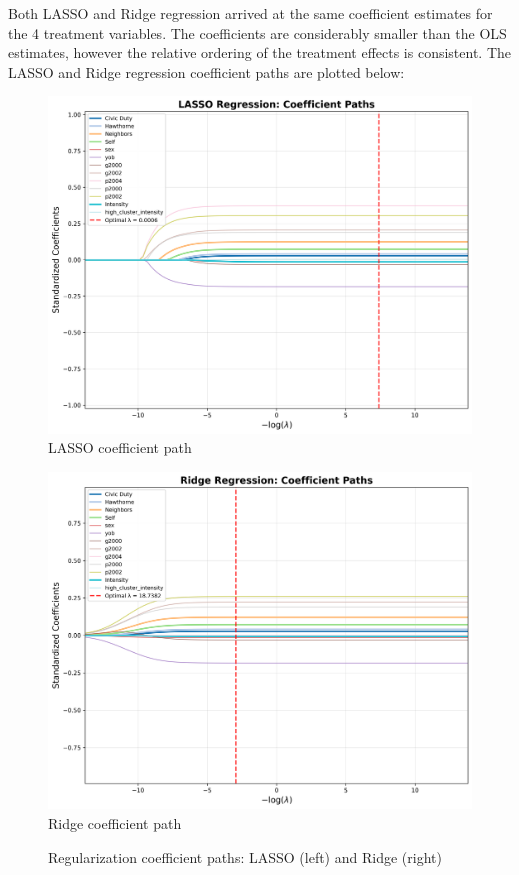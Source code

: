 \documentclass[11pt]{article}
\begin{document}
Both LASSO and Ridge regression arrived at the same coefficient estimates for the 4 treatment variables. The coefficients are considerably smaller than the OLS estimates, however the relative ordering of the treatment effects is consistent. The LASSO and Ridge regression coefficient paths are plotted below:
\begin{figure}[H]
    \centering
    \begin{minipage}[t]{0.48\textwidth}
        \centering
        \includegraphics[width=\linewidth]{../Output/Plots/lasso_coefficients.png}
        \vspace{0.3em}
        {\small LASSO coefficient path}
    \end{minipage}
    \hfill
    \begin{minipage}[t]{0.48\textwidth}
        \centering
        \includegraphics[width=\linewidth]{../Output/Plots/ridge_coefficients.png}
        \vspace{0.3em}
        {\small Ridge coefficient path}
    \end{minipage}
    \caption{Regularization coefficient paths: LASSO (left) and Ridge (right)}
    \label{fig:coef_paths}
\end{figure}
\end{document}
